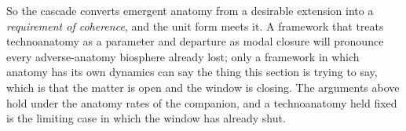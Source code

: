 \begin{remark}
So the cascade converts emergent anatomy from a desirable extension
into a \emph{requirement of coherence}, and the unit form meets it. A
framework that treats technoanatomy as a parameter and departure as
modal closure will pronounce every adverse-anatomy biosphere already
lost; only a framework in which anatomy has its own dynamics can say the
thing this section is trying to say, which is that the matter is open and
the window is closing. The arguments above hold under the anatomy rates
of the companion, and a technoanatomy held fixed is the limiting case in
which the window has already shut.
\end{remark}

